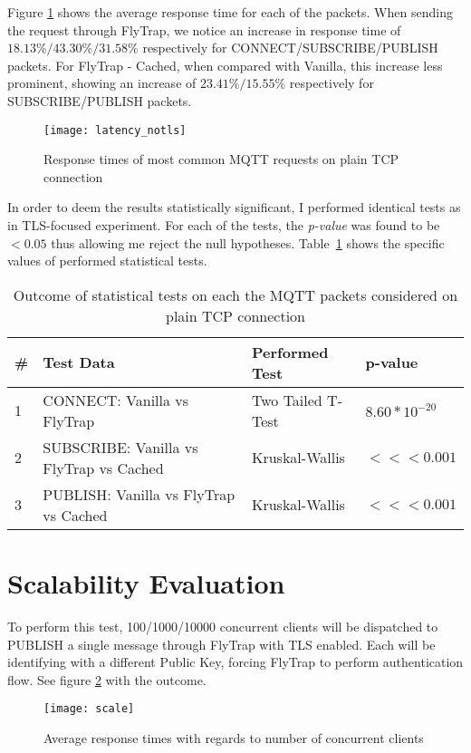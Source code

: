 Figure \ref{fig:latency_notls} shows the average response time for each of the packets. When sending the request through FlyTrap, we notice an increase in response time of $18.13\%/43.30\%/31.58\%$ respectively for CONNECT/SUBSCRIBE/PUBLISH packets. For FlyTrap - Cached, when compared with Vanilla, this increase less prominent, showing an increase of $23.41\%/15.55\%$ respectively for SUBSCRIBE/PUBLISH packets. 
\begin{figure}[h]
    \centering
    \texttt{[image: latency\_notls]}
    \caption{Response times of most common MQTT requests on plain TCP connection}
    \label{fig:latency_notls}
\end{figure}

In order to deem the results statistically significant, I performed identical tests as in TLS-focused experiment. For each of the tests, the \textit{p-value} was found to be $<0.05$ thus allowing me reject the null hypotheses. Table\ \ref{tab:ttest-notls} shows the specific values of performed statistical tests.

\begin{table}[h]
\centering
\begin{tabular}{|l|l|l|l|}
\hline
\textbf{\#} & \textbf{Test Data}                       & \textbf{Performed Test} & \textbf{p-value}                      \\ \hline
1           & CONNECT: Vanilla vs FlyTrap              & Two Tailed T-Test       & $8.60*10^{-20}$                    \\ \hline
2           & SUBSCRIBE: Vanilla vs FlyTrap vs Cached & Kruskal-Wallis          & $<<< 0.001$ \\ \hline
3           & PUBLISH: Vanilla vs FlyTrap vs Cached & Kruskal-Wallis          & $<<< 0.001$ \\ \hline
\end{tabular}
\caption{Outcome of statistical tests on each the MQTT packets considered on plain TCP connection}
\label{tab:ttest-notls}
\end{table}


\section{Scalability Evaluation}
To perform this test, 100/1000/10000 concurrent clients will be dispatched to PUBLISH a single message through FlyTrap with TLS enabled. Each will be identifying with a different Public Key, forcing FlyTrap to perform authentication flow. See figure \ref{fig:scale} with the outcome. 
\begin{figure}[h]
    \centering
    \texttt{[image: scale]}
    \caption{Average response times with regards to number of concurrent clients}
    \label{fig:scale}
\end{figure}

